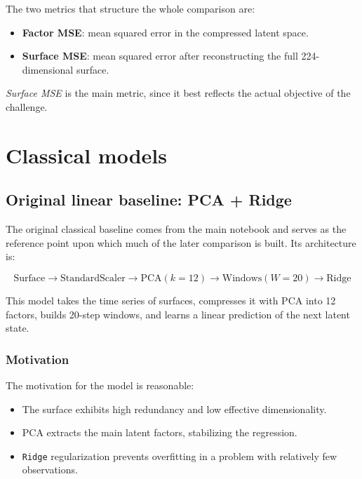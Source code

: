 \documentclass[11pt,a4paper]{article}
\begin{document}
The two metrics that structure the whole comparison are:

\begin{itemize}
    \item \textbf{Factor MSE}: mean squared error in the compressed latent space.
    \item \textbf{Surface MSE}: mean squared error after reconstructing the full 224-dimensional surface.
\end{itemize}

\textit{Surface MSE} is the main metric, since it best reflects the actual objective of the challenge.

\section{Classical models}

\subsection{Original linear baseline: PCA + Ridge}

The original classical baseline comes from the main notebook and serves as the reference point upon which much of the later comparison is built. Its architecture is:

\[
\text{Surface} \rightarrow \text{StandardScaler} \rightarrow \text{PCA}(k=12) \rightarrow \text{Windows}(W=20) \rightarrow \text{Ridge}
\]

This model takes the time series of surfaces, compresses it with PCA into 12 factors, builds 20-step windows, and learns a linear prediction of the next latent state.

\subsubsection{Motivation}
The motivation for the model is reasonable:

\begin{itemize}
    \item The surface exhibits high redundancy and low effective dimensionality.
    \item PCA extracts the main latent factors, stabilizing the regression.
    \item \texttt{Ridge} regularization prevents overfitting in a problem with relatively few observations.
\end{itemize}
\end{document}
